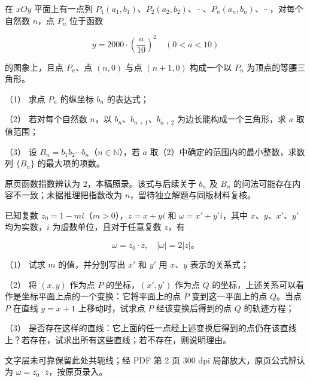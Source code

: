 \begin{question}
在 $xOy$ 平面上有一点列 $P_1(a_1,b_1)$、$P_2(a_2,b_2)$、$\cdots$、$P_n(a_n,b_n)$、$\cdots$，对每个自然数 $n$，点 $P_n$ 位于函数

\nopagebreak[4]
\[
y=2000\cdot\left(\dfrac{a}{10}\right)^2\quad(0<a<10)
\]

的图象上，且点 $P_n$、点 $(n,0)$ 与点 $(n+1,0)$ 构成一个以 $P_n$ 为顶点的等腰三角形。

（1） 求点 $P_n$ 的纵坐标 $b_n$ 的表达式；

（2） 若对每个自然数 $n$，以 $b_n$、$b_{n+1}$、$b_{n+2}$ 为边长能构成一个三角形，求 $a$ 取值范围；

（3） 设 $B_n=b_1b_2\cdots b_n$（$n\in\mathbb{N}$），若 $a$ 取（2）中确定的范围内的最小整数，求数列 $\{B_n\}$ 的最大项的项数。

\begin{gktip}
原页函数指数辨认为 2，本稿照录。该式与后续关于 $b_n$ 及 $B_n$ 的问法可能存在内容不一致；未据推理把指数改为 $n$，留待独立解题与同版材料复核。
\end{gktip}

\end{question}
\begin{question}
已知复数 $z_0=1-mi$（$m>0$），$z=x+yi$ 和 $\omega=x'+y'i$，其中 $x$、$y$、$x'$、$y'$ 均为实数，$i$ 为虚数单位，且对于任意复数 $z$，有

\nopagebreak[4]
\[
\omega=\overline{z_0}\cdot\overline z,\quad |\omega|=2|z|\mbox{。}
\]

（1） 试求 $m$ 的值，并分别写出 $x'$ 和 $y'$ 用 $x$、$y$ 表示的关系式；

（2） 将 $(x,y)$ 作为点 $P$ 的坐标，$(x',y')$ 作为点 $Q$ 的坐标，上述关系可以看作是坐标平面上点的一个变换：它将平面上的点 $P$ 变到这一平面上的点 $Q$。当点 $P$ 在直线 $y=x+1$ 上移动时，试求点 $P$ 经该变换后得到的点 $Q$ 的轨迹方程；

（3） 是否存在这样的直线：它上面的任一点经上述变换后得到的点仍在该直线上？若存在，试求出所有这些直线；若不存在，则说明理由。

\begin{gktip}
文字层未可靠保留此处共轭线；经 PDF 第 2 页 300 dpi 局部放大，原页公式辨认为 $\omega=\overline{z_0}\cdot\overline z$，按原页录入。
\end{gktip}

\end{question}